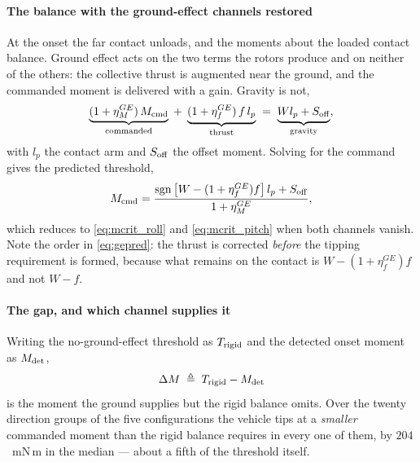 \documentclass[10pt]{article}
\begin{document}
\paragraph{The balance with the ground-effect channels restored}
At the onset the far contact unloads, and the moments about the loaded
contact balance. Ground effect acts on the two terms the rotors
produce and on neither of the others: the collective thrust is
augmented near the ground, and the commanded moment is delivered with a
gain. Gravity is not,
\begin{equation}
  \underbrace{(1+\eta_M^{GE})\,M_{\rm cmd}}_{\text{commanded}}
  \;+\;
  \underbrace{(1+\eta_f^{GE})\,f\,l_p}_{\text{thrust}}
  \;=\;
  \underbrace{W l_p + S_{\rm off}}_{\text{gravity}} ,
  \label{eq:gebalance}
\end{equation}
with $l_p$ the contact arm and $S_{\rm off}$ the offset moment. Solving
for the command gives the predicted threshold,
\begin{equation}
  M_{\rm cmd} =
  \frac{\mathrm{sgn}\,\bigl[W - (1+\eta_f^{GE})f\bigr]\,l_p
        + S_{\rm off}}{1+\eta_M^{GE}} ,
  \label{eq:gepred}
\end{equation}
which reduces to \eqref{eq:mcrit_roll} and \eqref{eq:mcrit_pitch} when
both channels vanish. Note the order in \eqref{eq:gepred}: the thrust
is corrected \emph{before} the tipping requirement is formed, because
what remains on the contact is $W - (1+\eta_f^{GE})f$ and not $W - f$.

\paragraph{The gap, and which channel supplies it}
Writing the no-ground-effect threshold as $T_{\rm rigid}$ and the
detected onset moment as $M_{\rm det}$,
\begin{equation}
  \Delta M \;\triangleq\; T_{\rm rigid} - M_{\rm det}
  \label{eq:gap}
\end{equation}
is the moment the ground supplies but the rigid balance omits. Over
the twenty direction groups of the five configurations the vehicle tips
at a \emph{smaller} commanded moment than the rigid balance requires in
every one of them, by $204$~mN\,m in the median --- about a fifth of
the threshold itself.
\end{document}
